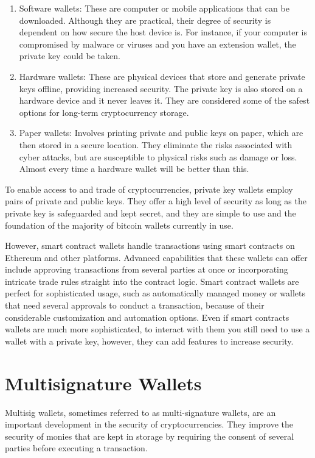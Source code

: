 \begin{enumerate}
	\item Software wallets: These are computer or mobile applications that can be downloaded. Although they are practical, their degree of security is dependent on how secure the host device is. For instance, if your computer is compromised by malware or viruses and you have an extension wallet, the private key could be taken.
	\item Hardware wallets: These are physical devices that store and generate private keys offline, providing increased security. The private key is also stored on a hardware device and it never leaves it. They are considered some of the safest options for long-term cryptocurrency storage.
	\item Paper wallets: Involves printing private and public keys on paper, which are then stored in a secure location. They eliminate the risks associated with cyber attacks, but are susceptible to physical risks such as damage or loss. Almost every time a hardware wallet will be better than this.
\end{enumerate}

To enable access to and trade of cryptocurrencies, private key wallets employ pairs of private and public keys. They offer a high level of security as long as the private key is safeguarded and kept secret, and they are simple to use and the foundation of the majority of bitcoin wallets currently in use.

However, smart contract wallets handle transactions using smart contracts on Ethereum and other platforms. Advanced capabilities that these wallets can offer include approving transactions from several parties at once or incorporating intricate trade rules straight into the contract logic. Smart contract wallets are perfect for sophisticated usage, such as automatically managed money or wallets that need several approvals to conduct a transaction, because of their considerable customization and automation options. Even if smart contracts wallets are much more sophisticated, to interact with them you still need to use a wallet with a private key, however, they can add features to increase security.

 \section{Multisignature Wallets}
\label{sec:ch2sec5} 
Multisig wallets, sometimes referred to as multi-signature wallets, are an important development in the security of cryptocurrencies. They improve the security of monies that are kept in storage by requiring the consent of several parties before executing a transaction.

